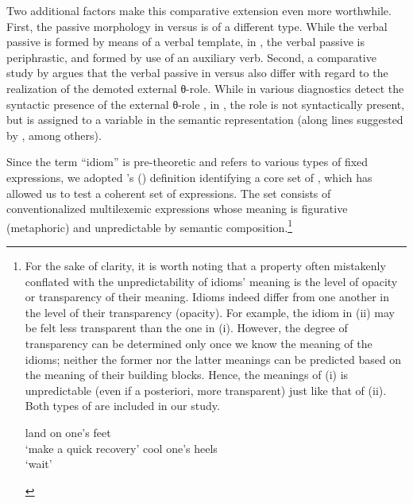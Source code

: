 \documentclass[output=paper]{langsci/langscibook}
\begin{document}
Two additional factors make this comparative extension even more worthwhile.
First, the passive morphology in  versus  is of a different
type.  While the  verbal passive is formed by means of a verbal
template, in , the verbal passive is periphrastic, and formed by use of
an auxiliary verb. Second, a comparative study by \citet{Meltzer-Asscher2012}
argues that the verbal passive in  versus  also differ with
regard to the realization of the demoted external θ-role. While in 
various diagnostics detect the syntactic presence of the external θ-role
\parencite[e.g.][]{Jaeggli1986,BakJohRob1989,Collins2005}, in , the
role is not syntactically present, but is assigned to a variable in the
semantic representation (along lines suggested by
\citealt{Chierchia2004,Reinhart2002,HorSil2009}, among others).

Since the term ``idiom'' is pre-theoretic and refers to various types of fixed
expressions, we adopted \citeauthor{HorSil2017}’s
(\citeyear{HorSil2017,HorSil2019}) definition identifying a core set of
, which has allowed us to test a coherent set of expressions. The
set consists of conventionalized multilexemic expressions whose meaning is
figurative (metaphoric) and unpredictable by semantic composition.\footnote{For
    the sake of clarity, it is worth noting that a property often mistakenly
    conflated with the unpredictability of idioms’ meaning is the level of
    opacity or transparency of their meaning. Idioms indeed differ from one
    another in the level of their transparency (opacity).  For example, the
    idiom in (ii) may be felt less transparent than the one in (i).  However,
    the degree of transparency can be determined only once we know the meaning
    of the idioms; neither the former nor the latter meanings can be predicted
    based on the meaning of their building blocks. Hence, the meanings of (i)
    is unpredictable (even if a posteriori, more transparent) just like that of
    (ii). Both types of  are included in our study.

    \begin{exe}
            land on one’s feet\\
            ‘make a quick recovery’
         cool one’s heels\\
            \enquote*{wait}
    \end{exe}}
\end{document}
